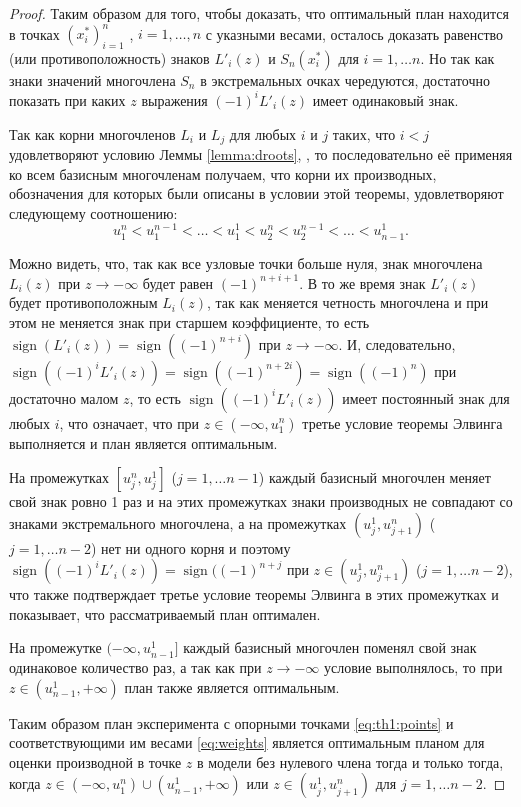 \documentclass[specialist,
               substylefile = spbu.rtx,
               subf,href,colorlinks=true, 12pt]{disser}
\theoremstyle{definition}
\DeclareMathOperator*{\sign}{sign}
\begin{document}
\begin{proof}
	Таким образом для того, чтобы доказать, что оптимальный план находится в точках $(x_i^*)_{i=1}^n$ , $i = 1, \ldots, n$ с указными весами, осталось доказать равенство (или противоположность) знаков $L'_i(z)$ и $ S_n(x_i^*)$ для $i = 1, \ldots n$. Но так как знаки значений многочлена $S_n$ в экстремальных очках чередуются, достаточно показать при каких $z$ выражения $(-1)^i L'_i(z)$ имеет одинаковый знак.
	
	Так как корни многочленов $L_i$ и $L_j$ для любых $i$ и $j$ таких, что $i < j$ удовлетворяют условию Леммы \ref{lemma:droots}, , то последовательно её применяя ко всем базисным многочленам получаем, что корни их производных, обозначения для которых были описаны в условии этой теоремы, удовлетворяют следующему соотношению:
	\begin{equation*}
		u^n_1 < u^{n-1}_1 < \ldots < u^1_1 < u^n_2 < u^{n-1}_2 < \ldots < u_{n-1}^1.
	\end{equation*}
	
	Можно видеть, что, так как все узловые точки больше нуля, знак многочлена $L_i(z)$ при $z \to -\infty$ будет равен $(-1)^{n+i+1}$. В то же время знак $L'_i(z)$ будет противоположным $L_i(z)$, так как меняется четность многочлена и при этом не меняется знак при старшем коэффициенте, то есть $\sign(L'_i(z)) = \sign((-1)^{n+i})$ при $z \to -\infty$. И, следовательно, $\sign((-1)^i L'_i(z)) = \sign((-1)^{n+2i}) = \sign((-1)^{n})$ при достаточно малом  $z $, то есть $\sign((-1)^i L'_i(z))$  имеет постоянный знак для любых $i$, что означает, что при $z \in (-\infty, u_1^n)$ третье условие теоремы Элвинга выполняется и план является оптимальным.
	
	На промежутках $[u_j^n, u_j^1]$ ($j = 1, \ldots {n-1}$) каждый базисный многочлен меняет свой знак ровно 1 раз и на этих промежутках знаки производных не совпадают со знаками экстремального многочлена, а на промежутках $(u_j^1, u_{j+1}^n)$ ($j=1, \ldots n-2$) нет ни одного корня и поэтому $\sign((-1)^i L'_i(z)) = \sign ((-1)^{n + j}$ при $z \in (u_j^1, u_{j+1}^n)$ ($j=1, \ldots n-2$), что также подтверждает третье условие теоремы Элвинга в этих промежутках и показывает, что рассматриваемый план оптимален.
	
	На промежутке $(-\infty, u_{n-1}^1]$ каждый базисный многочлен поменял свой знак одинаковое количество раз, а так как при $z \to -\infty$ условие выполнялось, то при $z \in (u_{n-1}^1, +\infty)$ план также является оптимальным.
	
	Таким образом план эксперимента с опорными точками \eqref{eq:th1:points} и соответствующими им весами \eqref{eq:weights} является оптимальным планом для оценки производной в точке $z$ в модели без нулевого члена тогда и только тогда, когда $z \in  (-\infty, u_1^n) \cup (u_{n-1}^1, +\infty)$ или $z \in (u_{j}^1, u_{j+1}^n)$ для $j=1, \ldots n-2$.

	\end{proof}
	
\end{document}
